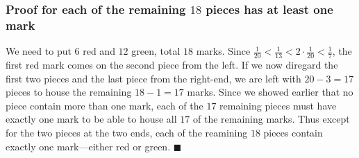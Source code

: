 \documentclass{article}
\begin{document}
\subsubsection{Proof for each of the remaining $18$ pieces has at least one mark}
We need to put $6$ red and $12$ green, total $18$ marks. Since $\frac{1}{20} < \frac{1}{13} < 2 \cdot \frac{1}{20} < \frac{1}{7}$, the first red mark comes on the second piece from the left. If we now diregard the first two pieces and the last piece from the right-end, we are left with $20-3 = 17$ pieces to house the remaining $18-1=17$ marks. Since we showed earlier that no piece contain more than one mark, each of the $17$ remaining pieces must have exactly one mark to be able to house all $17$ of the remaining marks. Thus except for the two pieces at the two ends, each of the reamining $18$ pieces contain exactly one mark---either red or green.  $\blacksquare$
\end{document}
